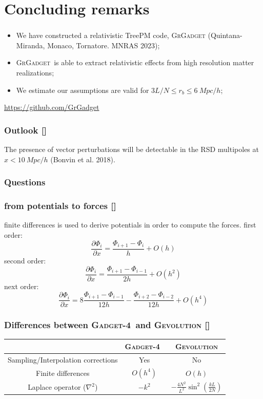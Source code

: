 \documentclass{beamer}
\makeatletter
\newcommand{\mylabel}{%
   [\beamer@againname]}
\newcommand{\gadget}{\textsc{Gadget-4}}
\newcommand{\grgadget}{\textsc{GrGadget}}
\newcommand{\gevolution}{\textsc{Gevolution}}
\makeatother
\begin{document}
\section{Concluding remarks}
\frame{\sectionpage}

\begin{frame}[label=conclusions]
    \frametitle{\insertsection\mylabel}
    \begin{itemize}
    	\item We have constructed a relativistic TreePM code, \grgadget
	(Quintana-Miranda, Monaco, Tornatore. MNRAS 2023);
	\item \grgadget\ is able to extract relativistic effects from high
	resolution matter realizations;
	\item We estimate our assumptions are valid for
	$3L/N \le r_b \le \SI{6}{Mpc}/h$;
    \end{itemize}
    \begin{block}{}
	    \url{https://github.com/GrGadget}
    \end{block}
\end{frame}

\begin{frame}[label=outlook]
    \frametitle{Outlook\mylabel}
    The presence of vector perturbations will be detectable in the RSD
    multipoles at $x<\SI{10}{Mpc}/h$ (Bonvin et al. 2018).
\end{frame}

\begin{frame}[label=questions]
    \frametitle{Questions}
\end{frame}

\begin{frame}[label=forcesnpotentials]
    \frametitle{from potentials to forces\mylabel}
    finite differences is used to derive potentials in order to compute the
    forces.
    first order:
    \[
        \frac{\partial \Phi_i}{\partial x} = \frac{ \Phi_{i+1} - \Phi_i }{h} + O(h)
    \]
    second order:
    \[
        \frac{\partial \Phi_i}{\partial x} =
         \frac{ \Phi_{i+1} - \Phi_{i-1} }{2h} + O(h^2)
    \]
    next order:
    \[
        \frac{\partial \Phi_i}{\partial x} =
        8\frac{ \Phi_{i+1} - \Phi_{i-1} }{12h} 
            - \frac{ \Phi_{i+2} - \Phi_{i-2} }{12h} + O(h^4)
    \]
\end{frame}

\begin{frame}[label=differencesPM]
	\frametitle{Differences between \gadget\ and \gevolution\mylabel}
	\begin{tabular}{ccc}
		& \gadget\ & \gevolution \\
		\hline
		Sampling/Interpolation corrections & Yes & No \\
		Finite differences & $O(h^4)$ & $O(h)$ \\
		Laplace operator ($\nabla^2$) & $-k^2 $
			& $- \frac{4 N^2}{L^2}\sin^2 \left(\frac{k L}{2N}\right) $\\
	\end{tabular}
\end{frame}
\end{document}
